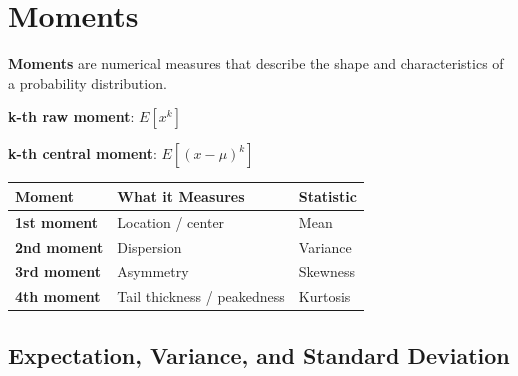 \documentclass[
  12pt,
  a4paper,
]{scrbook}
\newcounter{none} %
\theoremstyle{plain}
\theoremstyle{definition}
\theoremstyle{remark}
\begin{document}
\section{Moments}\label{moments}

\textbf{Moments} are numerical measures that describe the shape and
characteristics of a probability distribution.

\textbf{k-th raw moment}: \(E[x^k]\)

\textbf{k-th central moment}: \(E[(x-\mu)^k]\)


{\def\LTcaptype{none} %
\begin{longtable}[]{@{}lll@{}}
\toprule\noalign{}
Moment & What it Measures & Statistic \\
\midrule\noalign{}
\endhead
\bottomrule\noalign{}
\endlastfoot
\textbf{1st moment} & Location / center & Mean \\
\textbf{2nd moment} & Dispersion & Variance \\
\textbf{3rd moment} & Asymmetry & Skewness \\
\textbf{4th moment} & Tail thickness / peakedness & Kurtosis \\
\end{longtable}
}

\subsection{Expectation, Variance, and Standard
Deviation}\label{expectation-variance-and-standard-deviation}
\end{document}
